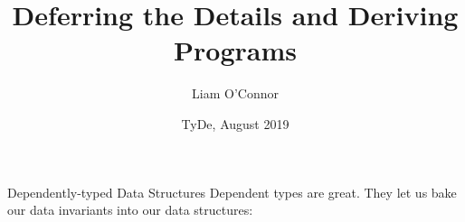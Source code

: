 \documentclass{beamer}
\title{Deferring the Details and Deriving Programs}
\author{Liam O'Connor}
\institute{UNSW Sydney, Australia}
\date{TyDe, August 2019}
\begin{document}
    \maketitle
    \begin{frame}[fragile]{Dependently-typed Data Structures}
        Dependent types are great. They let us bake our data invariants into 
        our data structures:
\begin{code}
\>[2]\AgdaSpace{}%
\AgdaSpace{}%
\AgdaSymbol{(}\AgdaSpace{}%
\AgdaSpace{}%
\AgdaSymbol{:}\AgdaSpace{}%
\AgdaSymbol{)}\AgdaSpace{}%
\AgdaSymbol{:}\AgdaSpace{}%
\AgdaSpace{}%
\<%
\\
\>[2][@{}l@{\AgdaIndent{0}}]%
\>[4]%
\>[9]\AgdaSymbol{:}\AgdaSpace{}%
\AgdaSymbol{(}\AgdaSpace{}%
\AgdaSpace{}%
\AgdaSymbol{)}\AgdaSpace{}%
\AgdaSpace{}%
\AgdaSpace{}%
\AgdaSpace{}%
\<%
\\
%
\>[4]\AgdaSpace{}%
\AgdaSymbol{:}\AgdaSpace{}%
\AgdaSymbol{(}\AgdaSpace{}%
\AgdaSymbol{:}\AgdaSpace{}%
\AgdaSymbol{)}\AgdaSpace{}%
\AgdaSpace{}%
\AgdaSymbol{(}\AgdaSpace{}%
\AgdaSpace{}%
\AgdaSymbol{)}\AgdaSpace{}%
\AgdaSpace{}%
\AgdaSpace{}%
\AgdaSpace{}%
\AgdaSpace{}%
\AgdaSpace{}%
\AgdaSpace{}%
\AgdaSpace{}%
\<%
%
\end{code}
\pause 
 
\begin{code}
\>[2]\AgdaSpace{}%
\AgdaSpace{}%
\AgdaSymbol{(}\AgdaSpace{}%
\AgdaSpace{}%
\AgdaSymbol{:}\AgdaSpace{}%
\AgdaSymbol{)}\AgdaSpace{}%
\AgdaSymbol{:}\AgdaSpace{}%
\AgdaSpace{}%
\<%
\\
\>[2][@{}l@{\AgdaIndent{0}}]%
\>[4]\AgdaSpace{}%
\AgdaSymbol{:}\AgdaSpace{}%
\AgdaSymbol{(}\AgdaSpace{}%
\AgdaSpace{}%
\AgdaSymbol{)}\AgdaSpace{}%
\AgdaSpace{}%
\AgdaSpace{}%
\AgdaSpace{}%
\<%
\\
%
\>[4]%
\>[12]\AgdaSymbol{:}\AgdaSpace{}%
\AgdaSymbol{(}\AgdaSpace{}%
\AgdaSymbol{:}\AgdaSpace{}%
\AgdaSymbol{)}\AgdaSpace{}%
\AgdaSpace{}%
\AgdaSpace{}%
\AgdaSpace{}%
\AgdaSpace{}%
\AgdaSpace{}%
\AgdaSpace{}%
\AgdaSpace{}%
\AgdaSpace{}%
\AgdaSpace{}%
\AgdaSpace{}%
\AgdaSpace{}%
\<%
%
\end{code}
    \end{frame}
\end{document}
